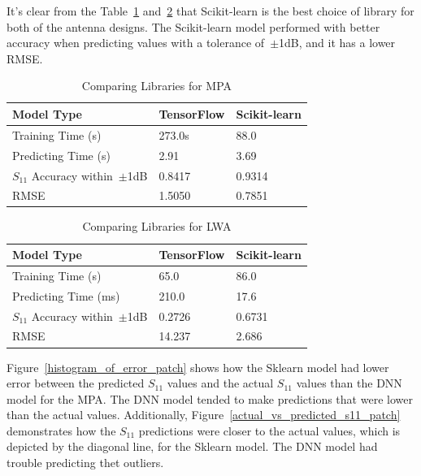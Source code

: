 \documentclass[conference]{IEEEtran}
\begin{document}
It's clear from the Table~\ref{comparing_libraries_p} and~\ref{comparing_libraries_lw} that Scikit-learn is the best choice of library for both of the antenna designs. The Scikit-learn model performed with better accuracy when predicting values with a tolerance of~$\pm$1dB, and it has a lower RMSE.

\begin{table}[h]
\caption{Comparing Libraries for MPA}
\begin{center}
\begin{tabular}{ |l|l|l| }
    \hline
    Model Type & TensorFlow & Scikit-learn \\ 
    \hline
    Training Time (s) & 273.0s & 88.0 \\  
    \hline
    Predicting Time (s) & 2.91 & 3.69 \\
    \hline
    $S_{11}$ Accuracy within~$\pm$1dB & 0.8417 & 0.9314 \\
    \hline
    RMSE & 1.5050 & 0.7851 \\
    \hline
\end{tabular}
\end{center}
\label{comparing_libraries_p}
\end{table}

\begin{table}[h]
\caption{Comparing Libraries for LWA}
\begin{center}
\begin{tabular}{ |l|l|l| }
    \hline
    Model Type & TensorFlow & Scikit-learn \\ 
    \hline
    Training Time (s) & 65.0 & 86.0 \\  
    \hline
    Predicting Time (ms) & 210.0 & 17.6 \\
    \hline
    $S_{11}$ Accuracy within~$\pm$1dB & 0.2726 & 0.6731 \\
    \hline
    RMSE & 14.237 & 2.686 \\
    \hline
\end{tabular}
\end{center}
\label{comparing_libraries_lw}
\end{table}

Figure~\ref{histogram_of_error_patch} shows how the Sklearn model had lower error between the predicted $S_{11}$ values and the actual $S_{11}$ values than the DNN model for the MPA. The DNN model tended to make predictions that were lower than the actual values. Additionally, Figure~\ref{actual_vs_predicted_s11_patch} demonstrates how the $S_{11}$ predictions were closer to the actual values, which is depicted by the diagonal line, for the Sklearn model. The DNN model had trouble predicting thet outliers. 
\end{document}
